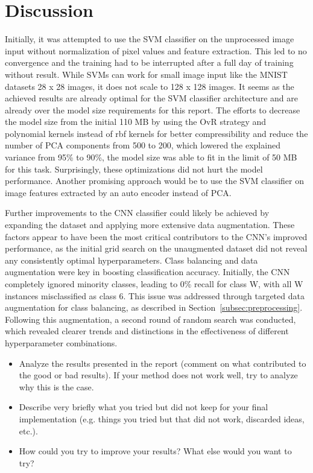 \documentclass[a4, 10 pt, conference]{ieeeconf}  %
\begin{document}
\section{Discussion}
\label{sec:discuss}

Initially, it was attempted to use the SVM classifier on the unprocessed image input
without normalization of pixel values and feature extraction. This led to no convergence
and the training had to be interrupted after a full day of training without result. While
SVMs can work for small image input like the MNIST datasets 28 x 28 images, it does not
scale to 128 x 128 images. It seems as the achieved results are already optimal for the 
SVM classifier architecture and are already over the model size requirements for this report.
The efforts to decrease the model size from the initial 110 MB by using the OvR strategy 
and polynomial kernels instead of rbf kernels for better compressibility and reduce the number of PCA components from 500
to 200, which lowered the explained variance from 95\% to 90\%, the model size was able to fit in 
the limit of 50 MB for this task. Surprisingly, these optimizations did not hurt the model performance.
Another promising approach would be to use the SVM classifier on image features extracted 
by an auto encoder instead of PCA.

Further improvements to the CNN classifier could likely be achieved by expanding the dataset and 
applying more extensive data augmentation. These factors appear to have been the most critical contributors to the CNN's 
improved performance, as the initial grid search on the unaugmented dataset did not reveal any consistently optimal 
hyperparameters. Class balancing and data augmentation were key in boosting classification accuracy. Initially, the CNN 
completely ignored minority classes, leading to 0\% recall for class W, with all W instances misclassified as class 6. 
This issue was addressed through targeted data augmentation for class balancing, as described in Section~\ref{subsec:preprocessing}. 
Following this augmentation, a second round of random search was conducted, which revealed clearer trends and distinctions 
in the effectiveness of different hyperparameter combinations.

{\color{blue}
\begin{itemize}
	\item Analyze the results presented in the report (comment on what contributed to the good or bad results). If your method does not work well, try to analyze why this is the case.
	\item Describe very briefly what you tried but did not keep for your final implementation (e.g. things you tried but that did not work, discarded ideas, etc.).
	\item How could you try to improve your results? What else would you want to try?

\end{itemize}
}
\end{document}

